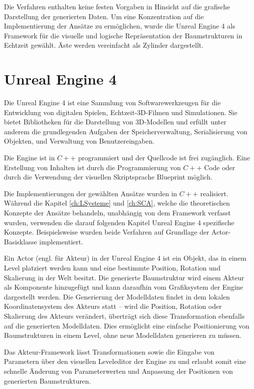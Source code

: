 Die Verfahren enthalten keine festen Vorgaben in Hinsicht auf die grafische Darstellung der generierten Daten. Um eine Konzentration auf die Implementierung der Ansätze zu ermöglichen, wurde die Unreal Engine 4 als Framework für die visuelle und logische Repräsentation der Baumstrukturen in Echtzeit gewählt. Äste werden vereinfacht als Zylinder dargestellt.

\section{Unreal Engine 4}

Die Unreal Engine 4 ist eine Sammlung von Softwarewerkzeugen für die Entwicklung von digitalen Spielen, Echtzeit-3D-Filmen und Simulationen.\cite{WhatIsUE:17}  Sie bietet Bibliotheken für die Darstellung von 3D-Modellen und erfüllt unter anderem die grundlegenden Aufgaben der Speicherverwaltung, Serialisierung von Objekten, und Verwaltung von Benutzereingaben. \cite{EngineFeatures:17}

Die Engine ist in $C++$ programmiert und der Quellcode ist frei zugänglich. Eine Erstellung von Inhalten ist durch die Programmierung von $C++$ Code oder durch die Verwendung der visuellen Skriptsprache \glqq Blueprint\grqq{} möglich. \cite{WhatIsUE:17}

Die Implementierungen der gewählten Ansätze wurden in $C++$ realisiert. Während die Kapitel \ref{ch:LSysteme} und \ref{ch:SCA}, welche die theoretischen Konzepte der Ansätze behandeln, unabhängig von dem Framework verfasst wurden, verwenden die darauf folgenden Kapitel Unreal Engine 4 spezifische Konzepte. Beispielsweise wurden beide Verfahren auf Grundlage der Actor-Basisklasse implementiert.

Ein Actor (engl. für Akteur) in der Unreal Engine 4 ist ein Objekt, das in einem Level platziert werden kann und eine bestimmte Position, Rotation und Skalierung in der Welt besitzt. Die generierte Baumstruktur wird einem Akteur als Komponente hinzugefügt und kann daraufhin vom Grafiksystem der Engine dargestellt werden. Die Generierung der Modelldaten findet in dem lokalen Koordinatensystem des Akteurs statt -- wird die Position, Rotation oder Skalierung des Akteurs verändert, überträgt sich diese Transformation ebenfalls auf die generierten Modelldaten. Dies ermöglicht eine einfache Positionierung von Baumstrukturen in einem Level, ohne neue Modelldaten generieren zu müssen. \cite{UnrealTerminology:17}

Das Akteur-Framework lässt Transformationen sowie die Eingabe von Parametern über den visuellen Leveleditor der Engine zu und erlaubt somit eine schnelle Änderung von Parameterwerten und Anpassung der Positionen von generierten Baumstrukturen. \cite{UnrealTerminology:17}

